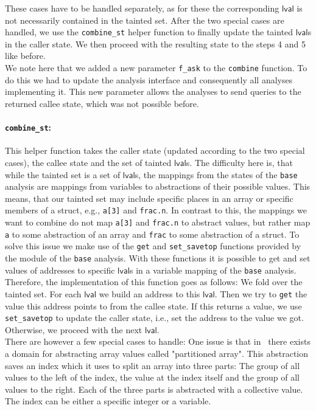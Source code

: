       These cases have to be handled separately, as for these the corresponding $\textsf{lval}$ is not necessarily contained in the tainted set. After the two special cases are handled, we use the \texttt{combine\_st} helper function to finally update the tainted $\textsf{lval}$s in the caller state. We then proceed with the resulting state to the steps 4 and 5 like before.\\
      We note here that we added a new parameter \texttt{f\_ask} to the \texttt{combine} function. To do this we had to update the analysis interface and consequently all analyses implementing it. This new parameter allows the analyses to send queries to the returned callee state, which was not possible before.
      \paragraph{\texttt{combine\_st}:} This helper function takes the caller state (updated according to the two special cases), the callee state and the set of tainted $\textsf{lval}$s. The difficulty here is, that while the tainted set is a set of $\textsf{lval}$s, the mappings from the states of the \texttt{base} analysis are mappings from variables to abstractions of their possible values. This means, that our tainted set may include specific places in an array or specific members of a struct, e.g., \texttt{a[3]} and \texttt{frac.n}. In contrast to this, the mappings we want to combine do not map \texttt{a[3]} and \texttt{frac.n} to abstract values, but rather map \texttt{a} to some abstraction of an array and \texttt{frac} to some abstraction of a struct. To solve this issue we make use of the \texttt{get} and \texttt{set\_savetop} functions provided by the module of the \texttt{base} analysis. With these functions it is possible to get and set values of addresses to specific $\textsf{lval}$s in a variable mapping of the \texttt{base} analysis.\\
      Therefore, the implementation of this function goes as follows: We fold over the tainted set. For each $\textsf{lval}$ we build an address to this $\textsf{lval}$. Then we try to \texttt{get} the value this address points to from the callee state. If this returns a value, we use \texttt{set\_savetop} to update the caller state, i.e., set the address to the value we got. Otherwise, we proceed with the next $\textsf{lval}$.\\
      There are however a few special cases to handle: One issue is that in \gob\ there exists a domain for abstracting array values called "partitioned array". This abstraction saves an index which it uses to split an array into three parts: The group of all values to the left of the index, the value at the index itself and the group of all values to the right. Each of the three parts is abstracted with a collective value. The index can be either a specific integer or a variable.\\
